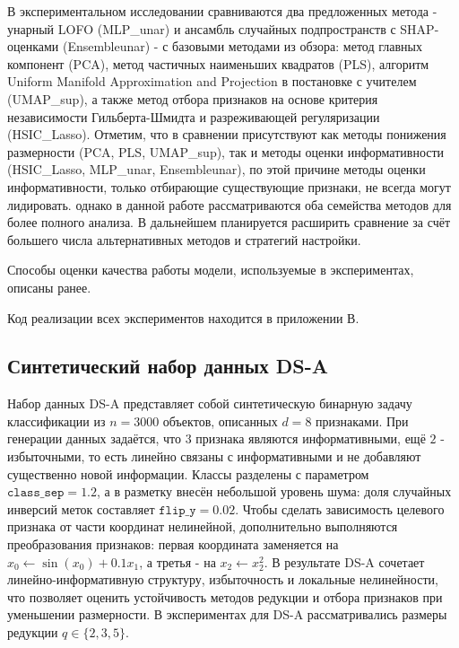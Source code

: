 \documentclass[12pt,a4paper]{article}
\begin{document}
В экспериментальном исследовании сравниваются два предложенных метода
- унарный LOFO (MLP\_unar) и ансамбль случайных подпространств с SHAP-оценками (Ensembleunar) -
с базовыми методами из обзора: метод главных компонент (PCA), метод частичных наименьших квадратов (PLS),
алгоритм Uniform Manifold Approximation and Projection в постановке с учителем (UMAP\_sup),
а также метод отбора признаков на основе критерия независимости Гильберта-Шмидта и разреживающей регуляризации (HSIC\_Lasso).
Отметим, что в сравнении присутствуют как методы понижения размерности (PCA, PLS, UMAP\_sup),
так и методы оценки информативности (HSIC\_Lasso, MLP\_unar, Ensembleunar),
по этой причине методы оценки информативности, только отбирающие существующие признаки, не всегда могут лидировать.
однако в данной работе рассматриваются оба семейства методов для более полного анализа.
В дальнейшем планируется расширить сравнение за счёт большего числа альтернативных методов и стратегий настройки.

Способы оценки качества работы модели, используемые в экспериментах, описаны ранее.

Код реализации всех экспериментов находится в приложении В.

\captionsetup{labelsep=period,justification=centering,font=small}
\renewcommand{\arraystretch}{1.15}

\subsection{Синтетический набор данных DS-A}

Набор данных DS-A представляет собой синтетическую бинарную задачу классификации из $n=3000$ объектов,
описанных $d=8$ признаками. При генерации данных задаётся, что $3$ признака являются информативными,
ещё $2$ - избыточными, то есть линейно связаны с информативными и не добавляют
существенно новой информации. Классы разделены с параметром $\texttt{class\_sep}=1.2$, а в разметку
внесён небольшой уровень шума: доля случайных инверсий меток составляет $\texttt{flip\_y}=0.02$.
Чтобы сделать зависимость целевого признака от части координат нелинейной, дополнительно выполняются
преобразования признаков: первая координата заменяется на $x_0\leftarrow \sin(x_0)+0.1x_1$,
а третья - на $x_2\leftarrow x_2^2$. В результате DS-A сочетает линейно-информативную структуру,
избыточность и локальные нелинейности, что позволяет оценить устойчивость методов редукции и отбора
признаков при уменьшении размерности. В экспериментах для DS-A рассматривались размеры редукции
$q\in\{2,3,5\}$.
\end{document}
